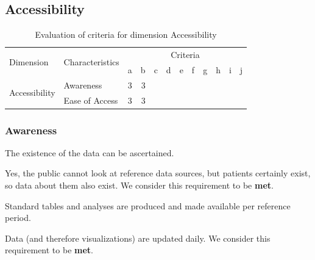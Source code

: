 \subsection{Accessibility}

\begin{table}[htbp]
    \centering

    \begin{tabular}{llrrrrrrrrrr}
        \toprule
        \multirow{2}{*}{Dimension}      & \multirow{2}{*}{Characteristics}  & \multicolumn{10}{c}{Criteria}         \\ \cmidrule(lr){3-12}
                                        &                                   & a & b & c & d & e & f & g & h & i & j \\ \midrule
        \multirow{2}{*}{Accessibility}  & Awareness                         & 3 & 3 &   &   &   &   &   &   &   &   \\
                                        & Ease of Access                    & 3 & 3 &   &   &   &   &   &   &   &   \\
        \bottomrule
    \end{tabular}

    \caption{Evaluation of criteria for dimension Accessibility}
    \label{table:accessibility-benchmark}
\end{table}
\FloatBarrier

\subsubsection{Awareness}

\begin{QandA}
    \item The existence of the data can be ascertained.
    \begin{answered}
        Yes, the public cannot look at reference data sources, but patients certainly exist, so data about them also exist.
        We consider this requirement to be \textbf{met}.
    \end{answered}

    \item Standard tables and analyses are produced and made available per reference period.
    \begin{answered}
        Data (and therefore visualizations) are updated daily.
        We consider this requirement to be \textbf{met}.
    \end{answered}

\end{QandA}

